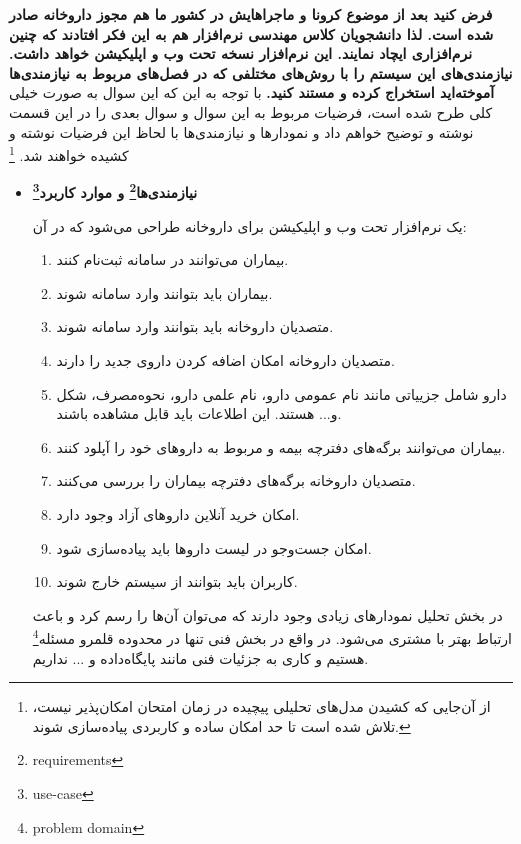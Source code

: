 
\textbf{ فرض کنید بعد از موضوع کرونا و ماجراهایش در کشور ما هم مجوز داروخانه صادر شده است. لذا دانشجویان کلاس مهندسی نرم‌افزار هم به این فکر افتادند که چنین نرم‌افزاری ایچاد نمایند. این نرم‌افزار نسخه تحت وب و اپلیکیشن خواهد داشت. نیازمندی‌های این سیستم را با روش‌های مختلفی که در فصل‌های مربوط به نیازمندی‌ها آموخته‌اید استخراج کرده و مستند کنید.}
\newline
با توجه به این که این سوال به صورت خیلی کلی طرح شده است، فرضیات مربوط به این سوال و سوال بعدی را در این قسمت نوشته و توضیح خواهم داد و نمودارها و نیازمندی‌ها با لحاظ این فرضیات نوشته و کشیده خواهند شد. \footnote{از آن‌جایی که کشیدن مدل‌های تحلیلی پیچیده در زمان امتحان امکان‌پذیر نیست، تلاش شده است تا حد امکان ساده و کاربردی پیاده‌سازی شوند.}

\begin{itemize}
	\item \textbf{نیازمندی‌ها\footnote{requirements} و موارد کاربرد\footnote{use-case}}
	
یک نرم‌افزار تحت وب و اپلیکیشن برای داروخانه طراحی می‌شود که در آن:
	\begin{enumerate}
		\item
		بیماران می‌توانند در سامانه ثبت‌نام کنند.
		\item 
		بیماران باید بتوانند وارد سامانه شوند.
		\item 
		متصدیان داروخانه باید بتوانند وارد سامانه شوند.
		\item 
		متصدیان داروخانه امکان اضافه کردن داروی جدید را دارند.
		\item 
		دارو شامل جزيیاتی مانند نام عمومی دارو، نام علمی دارو، نحوه‌مصرف، شکل و... هستند. این اطلاعات باید قابل مشاهده باشند.
		\item بیماران می‌توانند برگه‌های دفترچه بیمه و مربوط به داروهای خود را آپلود کنند.
		\item 
		متصدیان داروخانه برگه‌های دفترچه بیماران را بررسی می‌کنند.
		\item 
		امکان خرید آنلاین داروهای آزاد وجود دارد.

		\item 
		امکان جست‌وجو در لیست داروها باید پیاده‌سازی شود.
		\item 
		کاربران باید بتوانند از سیستم خارج شوند.

	\end{enumerate}

در بخش تحلیل نمودار‌های زیادی وجود دارند که می‌توان آن‌ها را رسم کرد و باعث ارتباط بهتر با مشتری می‌شود. در واقع در بخش فنی تنها در محدوده قلمرو مسئله\footnote{problem domain} هستیم و کاری به جزئیات فنی مانند پایگاه‌داده و ... نداریم. 


\end{itemize}
